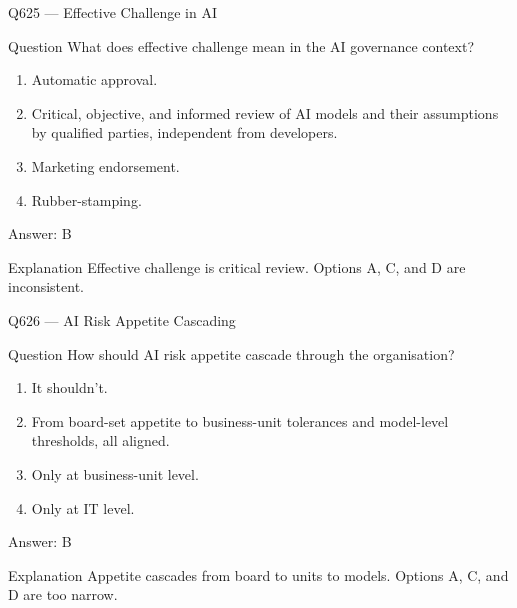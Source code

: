 \documentclass[aspectratio=169,8pt]{beamer}
\begin{document}
	\begin{frame}{Q625 --- Effective Challenge in AI}
		\begin{block}{Question}
			What does effective challenge mean in the AI governance context?
			\begin{enumerate}
				\item Automatic approval.
				\item Critical, objective, and informed review of AI models and their assumptions by qualified parties, independent from developers.
				\item Marketing endorsement.
				\item Rubber-stamping.
			\end{enumerate}
		\end{block}
		\begin{exampleblock}{Answer: B}\end{exampleblock}
		\begin{block}{Explanation}
			Effective challenge is critical review. Options A, C, and D are inconsistent.
		\end{block}
	\end{frame}
	
	\begin{frame}{Q626 --- AI Risk Appetite Cascading}
		\begin{block}{Question}
			How should AI risk appetite cascade through the organisation?
			\begin{enumerate}
				\item It shouldn't.
				\item From board-set appetite to business-unit tolerances and model-level thresholds, all aligned.
				\item Only at business-unit level.
				\item Only at IT level.
			\end{enumerate}
		\end{block}
		\begin{exampleblock}{Answer: B}\end{exampleblock}
		\begin{block}{Explanation}
			Appetite cascades from board to units to models. Options A, C, and D are too narrow.
		\end{block}
	\end{frame}
	
\end{document}
